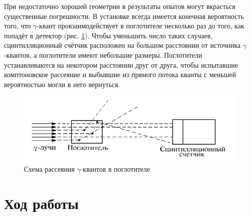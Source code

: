     При недостаточно хорошей геометрии в результаты опытов могут вкрасться существенные погрешности. В установке всегда имеется конечная вероятность того, 
    что $\gamma$-квант провзаимодействует в поглотителе несколько раз до того, как попадёт в детектор (рис. \ref{setup2}). 
    Чтобы уменьшить число таких случаев, сцинтилляционный счётчик  расположен на большом расстоянии от источника $\gamma$-квантов, а поглотители имеют небольшие размеры.
    Поглотители устанавливаются на некотором расстоянии друг от друга, чтобы испытавшие комптоновское рассеяние и выбывшие из прямого потока кванты с меньшей вероятностью могли в него вернуться.

    \begin{figure}[h!]
        \begin{center}
            \includegraphics[width = 12 cm]{images/setup_2}
            \caption{Схема рассеяния $\gamma$-квантов в поглотителе}
            \label{setup2}
        \end{center}
    \end{figure}

\section{Ход работы}


